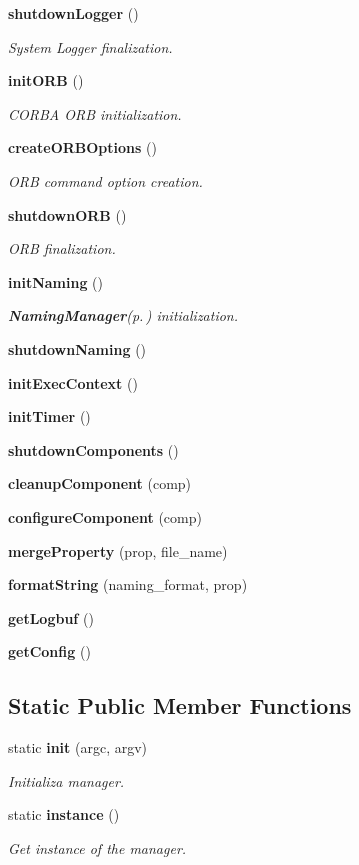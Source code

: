 \begin{CompactItemize}
{\bf shutdown\-Logger} ()
\begin{CompactList}\small\item\em System Logger finalization. \item\end{CompactList}\item 
{\bf init\-ORB} ()
\begin{CompactList}\small\item\em CORBA ORB initialization. \item\end{CompactList}\item 
{\bf create\-ORBOptions} ()
\begin{CompactList}\small\item\em ORB command option creation. \item\end{CompactList}\item 
{\bf shutdown\-ORB} ()
\begin{CompactList}\small\item\em ORB finalization. \item\end{CompactList}\item 
{\bf init\-Naming} ()
\begin{CompactList}\small\item\em {\bf Naming\-Manager}{\rm (p.\,\pageref{classNamingManager})} initialization. \item\end{CompactList}\item 
{\bf shutdown\-Naming} ()
\item 
{\bf init\-Exec\-Context} ()
\item 
{\bf init\-Timer} ()
\item 
{\bf shutdown\-Components} ()
\item 
{\bf cleanup\-Component} (comp)
\item 
{\bf configure\-Component} (comp)
\item 
{\bf merge\-Property} (prop, file\_\-name)
\item 
{\bf format\-String} (naming\_\-format, prop)
\item 
{\bf get\-Logbuf} ()
\item 
{\bf get\-Config} ()
\end{CompactItemize}
\subsection*{Static Public Member Functions}
\begin{CompactItemize}
\item 
static {\bf init} (argc, argv)
\begin{CompactList}\small\item\em Initializa manager. \item\end{CompactList}\item 
static {\bf instance} ()
\begin{CompactList}\small\item\em Get instance of the manager. \item\end{CompactList}\end{CompactItemize}
